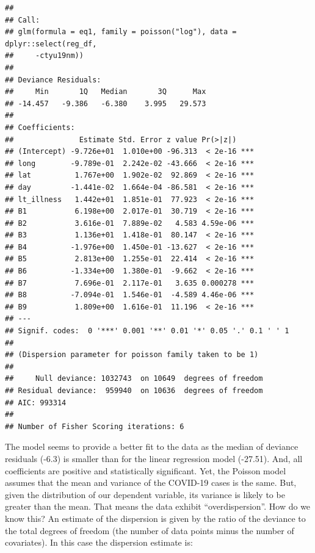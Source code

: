 \documentclass[
]{book}
\newenvironment{Shaded}{\begin{snugshade}}{\end{snugshade}}
\newcommand{\NormalTok}[1]{#1}
\newcommand{\OperatorTok}[1]{\textcolor[rgb]{0.81,0.36,0.00}{\textbf{#1}}}
\newcommand{\StringTok}[1]{\textcolor[rgb]{0.31,0.60,0.02}{#1}}
\begin{document}
\begin{verbatim}
## 
## Call:
## glm(formula = eq1, family = poisson("log"), data = dplyr::select(reg_df, 
##     -ctyu19nm))
## 
## Deviance Residuals: 
##     Min       1Q   Median       3Q      Max  
## -14.457   -9.386   -6.380    3.995   29.573  
## 
## Coefficients:
##               Estimate Std. Error z value Pr(>|z|)    
## (Intercept) -9.726e+01  1.010e+00 -96.313  < 2e-16 ***
## long        -9.789e-01  2.242e-02 -43.666  < 2e-16 ***
## lat          1.767e+00  1.902e-02  92.869  < 2e-16 ***
## day         -1.441e-02  1.664e-04 -86.581  < 2e-16 ***
## lt_illness   1.442e+01  1.851e-01  77.923  < 2e-16 ***
## B1           6.198e+00  2.017e-01  30.719  < 2e-16 ***
## B2           3.616e-01  7.889e-02   4.583 4.59e-06 ***
## B3           1.136e+01  1.418e-01  80.147  < 2e-16 ***
## B4          -1.976e+00  1.450e-01 -13.627  < 2e-16 ***
## B5           2.813e+00  1.255e-01  22.414  < 2e-16 ***
## B6          -1.334e+00  1.380e-01  -9.662  < 2e-16 ***
## B7           7.696e-01  2.117e-01   3.635 0.000278 ***
## B8          -7.094e-01  1.546e-01  -4.589 4.46e-06 ***
## B9           1.809e+00  1.616e-01  11.196  < 2e-16 ***
## ---
## Signif. codes:  0 '***' 0.001 '**' 0.01 '*' 0.05 '.' 0.1 ' ' 1
## 
## (Dispersion parameter for poisson family taken to be 1)
## 
##     Null deviance: 1032743  on 10649  degrees of freedom
## Residual deviance:  959940  on 10636  degrees of freedom
## AIC: 993314
## 
## Number of Fisher Scoring iterations: 6
\end{verbatim}

The model seems to provide a better fit to the data as the median of deviance residuals (-6.3) is smaller than for the linear regression model (-27.51). And, all coefficients are positive and statistically significant. Yet, the Poisson model assumes that the mean and variance of the COVID-19 cases is the same. But, given the distribution of our dependent variable, its variance is likely to be greater than the mean. That means the data exhibit ``overdispersion''. How do we know this? An estimate of the dispersion is given by the ratio of the deviance to the total degrees of freedom (the number of data points minus the number of covariates). In this case the dispersion estimate is:

\begin{Shaded}
\end{Shaded}
\end{document}
